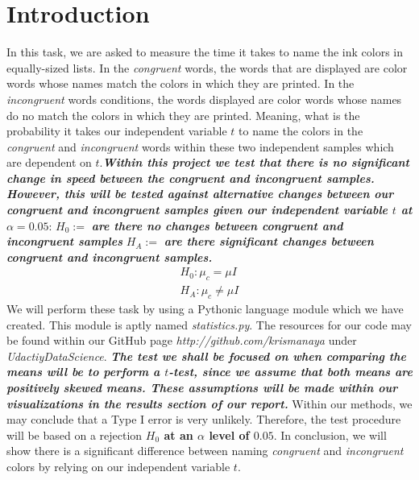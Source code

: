 \documentclass[8pt]{article}
\newcommand{\8}{\bar}
\begin{document}
\section{Introduction}
In this task, we are asked to measure the time it takes to name the ink colors in equally-sized lists. In the \textit{congruent} words, the words that are displayed are color words whose names match the colors in which they are printed. In the \textit{incongruent} words conditions, the words displayed are color words whose names do no match the colors in which they are printed. Meaning, what is the probability it takes our independent variable $t$ to name the colors in the \textit{congruent} and \textit{incongruent} words within these two independent samples which are dependent on $t$.\textbf{\textit{Within this project we test that there is no significant change in speed between the  \textit{congruent} and \textit{incongruent} samples. However, this will be tested against alternative changes between our \textit{congruent} and \textit{incongruent} samples given our independent variable $t$ at $\alpha = 0.05$}}: \newline \newline
$H_{0} :=$ \textbf{\textit{are there no changes between \textit{congruent} and \textit{incongruent} samples}} \newline
$H_{A} :=$ \textbf{\textit{are there significant changes between \textit{congruent} and \textit{incongruent} samples.}} 
\begin{equation}
\begin{split}
H_{0}: \mu_{c} = \mu{I}  \\
H_{A}: \mu_{c} \not= \mu{I}
\end{split}
\end{equation}
We will perform these task by using a Pythonic language module which we have created. This module is aptly named \textit{statistics.py}. 
The resources for our code may be found within our GitHub page \textit{http://github.com/krismanaya} under \textit{UdactiyDataScience}. \textbf{\textit{The test we shall be focused on when comparing the means will be to perform a $t$-test, since we assume that both means are  positively skewed means. These assumptions will be made within our visualizations in the results section of our report.}} Within our methods, we may conclude that a Type I error is very unlikely. Therefore, the test procedure will be based on a rejection \textbf{$H_{0}$ at an $\alpha$ level of $0.05$}. In conclusion, we will show there is a significant difference between naming \textit{congruent} and \textit{incongruent} colors by relying on our independent variable $t$. 
\newpage
\end{document}
